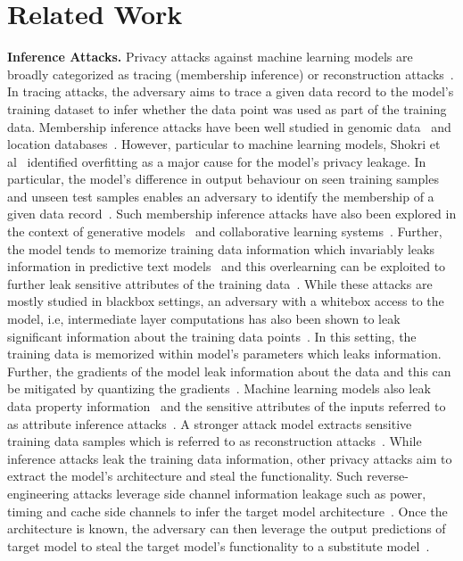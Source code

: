 \section{Related Work}\label{related}

\noindent\textbf{Inference Attacks.} Privacy attacks against machine learning models are broadly categorized as tracing (membership inference) or reconstruction attacks~\cite{1190751}.
In tracing attacks, the adversary aims to trace a given data record to the model's training dataset to infer whether the data point was used as part of the training data.
Membership inference attacks have been well studied in genomic data~\cite{10.1145/2976749.2978355} and location databases~\cite{DBLP:conf/ndss/PyrgelisTC18}.
However, particular to machine learning models, Shokri et al~\cite{shokri2017membership} identified overfitting as a major cause for the model's privacy leakage.
In particular, the model's difference in output behaviour on seen training samples and unseen test samples enables an adversary to identify the membership of a given data record~\cite{salem2018ml,8429311}.
Such membership inference attacks have also been explored in the context of generative models~\cite{LOGANMembershipInferenceAttacksAgainstGenerativeModels} and collaborative learning systems~\cite{DBLP:journals/corr/abs-1812-00910,melis2019exploiting}.
Further, the model tends to memorize training data information which invariably leaks information in predictive text models~\cite{236216,10.1145/3133956.3134077} and this overlearning can be exploited to further leak sensitive attributes of the training data~\cite{Song2020Overlearning}.
While these attacks are mostly studied in blackbox settings, an adversary with a whitebox access to the model, i.e, intermediate layer computations has also been shown to leak significant information about the training data points~\cite{leino2019stolen,DBLP:journals/corr/abs-1812-00910}.
In this setting, the training data is memorized within model's parameters which leaks information.
Further, the gradients of the model leak information about the data and this can be mitigated by quantizing the gradients~\cite{DBLP:journals/corr/abs-1906-08935}.
Machine learning models also leak data property information~\cite{Ganju:2018:PIA:3243734.3243834} and the sensitive attributes of the inputs referred to as attribute inference attacks~\cite{Fredrikson:2015:MIA:2810103.2813677,Hitaj:2017:DMU:3133956.3134012,Ateniese:2015:HSM:2829869.2829870}.
A stronger attack model extracts sensitive training data samples which is referred to as reconstruction attacks~\cite{salem2019updates,shokri2019privacy}.
While inference attacks leak the training data information, other privacy attacks aim to extract the model's architecture and steal the functionality.
Such reverse-engineering attacks leverage side channel information leakage such as power, timing and cache side channels to infer the target model architecture~\cite{236204,hong2019security,duddu2018stealing,10.1145/3274694.3274696,DBLP:journals/corr/abs-1808-04761}.
Once the architecture is known, the adversary can then leverage the output predictions of target model to steal the target model's functionality to a substitute model~\cite{10.5555/3241094.3241142,jacson2018ijcnn}.


